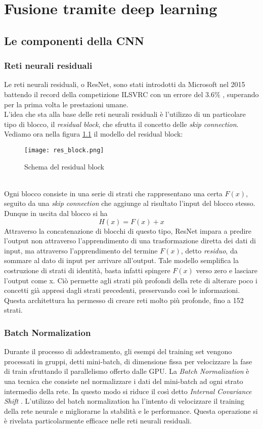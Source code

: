 \chapter{Fusione tramite deep learning}

\section{Le componenti della CNN}
\subsection{Reti neurali residuali}
Le reti neurali residuali, o ResNet, sono stati introdotti da Microsoft nel 2015 battendo il record della competizione ILSVRC con un errore del 3.6\% \cite{resnet}, superando per la prima volta le prestazioni umane.\\
L'idea che sta alla base delle reti neurali residuali è l'utilizzo di un particolare tipo di blocco, il \textit{residual block}, che sfrutta il concetto delle \textit{skip connection}. \\
Vediamo ora nella figura \ref{resblock} il modello del residual block:
\begin{figure}[ht]
    \centering
    \texttt{[image: res\_block.png]}
    \caption[Residual block]{Schema del residual block}
    \label{resblock}
\end{figure}\\
Ogni blocco consiste in una serie di strati che rappresentano una certa $F(x)$, seguito da una \textit{skip connection} che aggiunge al risultato l'input del blocco stesso. Dunque in uscita dal blocco si ha
$$ H(x)=F(x)+x $$
Attraverso la concatenazione di blocchi di questo tipo, ResNet impara a predire l'output non attraverso l'apprendimento di una trasformazione diretta dei dati di input, ma attraverso l'apprendimento del termine $F(x)$, detto \textit{residuo}, da sommare al dato di input per arrivare all'output. Tale modello semplifica la costruzione di strati di identità, basta infatti spingere $F(x)$ verso zero e lasciare l'output come x. Ciò permette agli strati più profondi della rete di alterare poco i concetti già appresi dagli strati precedenti, preservando così le informazioni. Questa architettura ha permesso di creare reti molto più profonde, fino a 152 strati.

\subsection{Batch Normalization}
Durante il processo di addestramento, gli esempi del training set vengono processati in gruppi, detti mini-batch, di dimensione fissa per velocizzare la fase di train sfruttando il parallelismo offerto dalle GPU. La \textit{Batch Normalization} è una tecnica che consiste nel normalizzare i dati del mini-batch ad ogni strato intermedio della rete. In questo modo si riduce il così detto \textit{Internal Covariance Shift} \cite{batchnormalization}. L'utilizzo del batch normalization ha l'intento di velocizzare il training della rete neurale e migliorarne la stabilità e le performance. Questa operazione si è rivelata particolarmente efficace nelle reti neurali residuali.

